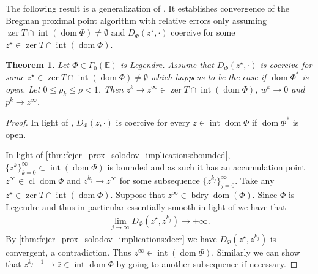 \documentclass[11pt,onecolumn]{article}
\DeclareMathOperator{\dom}{dom}
\DeclareMathOperator{\intr}{int}
\DeclareMathOperator{\bdry}{bdry}
\DeclareMathOperator{\cl}{cl}
\DeclareMathOperator{\zer}{zer}
\newtheorem{theorem}{Theorem}[section]
\theoremstyle{remark}
\begin{document}
The following result is a generalization of \cite[Proposition 4.4]{solodov2000inexact}. It establishes convergence of the Bregman proximal point algorithm with relative errors only assuming $\zer T \cap \intr (\dom \Phi) \neq \emptyset$ and $D_\Phi(z^\star, \cdot)$ coercive for some $z^\star \in \zer T \cap \intr (\dom \Phi) $.
\begin{theorem} \label{thm:convergence_interior}
Let $\Phi\in \Gamma_0(\mathbb{E})$ is Legendre. Assume that $D_\Phi(z^\star, \cdot)$ is coercive for some $z^\star \in \zer T \cap \intr (\dom \Phi) \neq \emptyset$ which happens to be the case if $\dom \Phi^*$ is open. Let $0\leq \rho_k\leq \rho < 1$. Then $z^k \to z^\infty \in \zer T \cap \intr (\dom \Phi)$, $w^k \to 0$ and $p^k \to z^\infty$.
\end{theorem}
\begin{proof}
In light of \cite[Theorem 3.7(vi)]{bauschke1997legendre}, $D_\Phi(z, \cdot)$ is coercive for every $z \in \intr \dom \Phi$ if $\dom \Phi^*$ is open.

In light of \cref{thm:fejer_prox_solodov_implications:bounded}, $\{z^k\}_{k=0}^\infty\subset \intr (\dom \Phi)$ is bounded and as such it has an accumulation point $z^\infty \in \cl \dom \Phi$ and $z^{k_j} \to z^\infty$ for some subsequence $\{z^{k_j}\}_{j=0}^\infty$. Take any $z^\star \in \zer T \cap \intr (\dom \Phi)$. Suppose that $z^\infty \in \bdry \dom(\Phi)$. Since $\Phi$ is Legendre and thus in particular essentially smooth in light of \cite[Theorem 3.8(i)]{bauschke1997legendre} we have that
\begin{align}
    \lim_{j \to \infty} D_\Phi(z^\star, z^{k_j}) \to +\infty.
\end{align}
By \cref{thm:fejer_prox_solodov_implications:decr} we have $D_\Phi(z^\star, z^{k_j})$ is convergent, a contradiction. Thus $z^\infty \in \intr (\dom \Phi)$. Similarly we can show that $z^{k_j+1} \to \bar z\in \intr \dom \Phi$ by going to another subsequence if necessary.


\end{proof}
\end{document}
